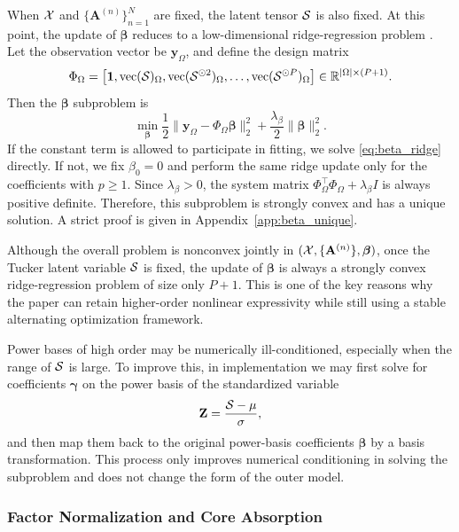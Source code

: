 When $\mathcal{X}$ and $\{\mathbf A^{(n)}\}_{n=1}^{N}$ are fixed, the latent tensor $\mathcal{S}$ is also fixed. At this point, the update of $\boldsymbol\beta$ reduces to a low-dimensional ridge-regression problem \cite{hoerl1970ridge}. Let the observation vector be $\mathbf y_\Omega$, and define the design matrix
\begin{equation}
\label{eq:PhiOmega_main}
\Phi_\Omega
=
\left[
\mathbf 1,
\mathrm{vec}(\mathcal{S})_\Omega,
\mathrm{vec}(\mathcal{S}^{\odot 2})_\Omega,
\dots,
\mathrm{vec}(\mathcal{S}^{\odot P})_\Omega
\right]
\in \mathbb R^{|\Omega|\times(P+1)}.
\end{equation}
Then the $\boldsymbol\beta$ subproblem is
\begin{equation}
\label{eq:beta_ridge}
\min_{\boldsymbol\beta}
\frac12\|\mathbf y_\Omega-\Phi_\Omega\boldsymbol\beta\|_2^2
+
\frac{\lambda_\beta}{2}\|\boldsymbol\beta\|_2^2.
\end{equation}
If the constant term is allowed to participate in fitting, we solve \eqref{eq:beta_ridge} directly. If not, we fix $\beta_0=0$ and perform the same ridge update only for the coefficients with $p\ge 1$. Since $\lambda_\beta>0$, the system matrix $\Phi_\Omega^\top\Phi_\Omega+\lambda_\beta I$ is always positive definite. Therefore, this subproblem is strongly convex and has a unique solution. A strict proof is given in Appendix~\ref{app:beta_unique}.

Although the overall problem is nonconvex jointly in $(\mathcal{X},\{\mathbf A^{(n)}\},\boldsymbol\beta)$, once the Tucker latent variable $\mathcal{S}$ is fixed, the update of $\boldsymbol\beta$ is always a strongly convex ridge-regression problem of size only $P+1$. This is one of the key reasons why the paper can retain higher-order nonlinear expressivity while still using a stable alternating optimization framework.

Power bases of high order may be numerically ill-conditioned, especially when the range of $\mathcal{S}$ is large. To improve this, in implementation we may first solve for coefficients $\boldsymbol\gamma$ on the power basis of the standardized variable
\begin{equation}
\mathbf Z = \frac{\mathcal{S}-\mu}{\sigma},
\end{equation}
and then map them back to the original power-basis coefficients $\boldsymbol\beta$ by a basis transformation. This process only improves numerical conditioning in solving the subproblem and does not change the form of the outer model.

\subsubsection{Factor Normalization and Core Absorption}

